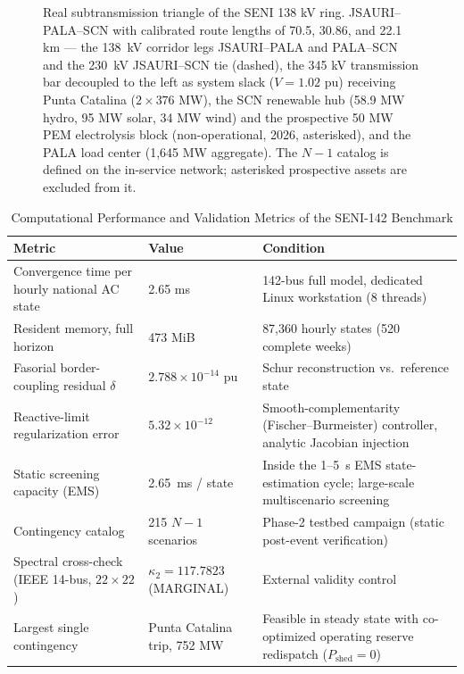 \begin{figure}[!t]
\centering
\resizebox{0.80\textwidth}{!}{} %
\caption{Real subtransmission triangle of the SENI 138 kV ring. JSAURI--PALA--SCN with calibrated route lengths of 70.5, 30.86, and 22.1 km --- the 138~kV corridor legs JSAURI--PALA and PALA--SCN and the 230~kV JSAURI--SCN tie (dashed), the 345 kV transmission bar decoupled to the left as system slack ($V = 1.02$ pu) receiving Punta Catalina ($2 \times 376$ MW), the SCN renewable hub (58.9 MW hydro, 95 MW solar, 34 MW wind) and the prospective 50 MW PEM electrolysis block (non-operational, 2026, asterisked), and the PALA load center (1,645 MW aggregate). The $N-1$ catalog is defined on the in-service network; asterisked prospective assets are excluded from it.}
\label{fig:topologia_seni}
\end{figure}

\begin{table}[!t]
\caption{Computational Performance and Validation Metrics of the SENI-142 Benchmark}
\label{tab:telemetry}
\centering
\footnotesize
\begin{tabular}{@{}p{} p{} p{}@{}}
\toprule
\textbf{Metric} & \textbf{Value} & \textbf{Condition} \\
\midrule
Convergence time per hourly national AC state & 2.65 ms & 142-bus full model, dedicated Linux workstation (8 threads) \\
Resident memory, full horizon & 473 MiB & 87,360 hourly states (520 complete weeks) \\
Fasorial border-coupling residual $\delta$ & $2.788 \times 10^{-14}$ pu & Schur reconstruction vs.\ reference state \\
Reactive-limit regularization error & $5.32 \times 10^{-12}$ & Smooth-complementarity (Fischer--Burmeister) controller, analytic Jacobian injection \\
Static screening capacity (EMS) & 2.65~ms / state & Inside the 1--5~s EMS state-estimation cycle; large-scale multiscenario screening \\
Contingency catalog & 215 $N-1$ scenarios & Phase-2 testbed campaign (static post-event verification) \\
Spectral cross-check (IEEE 14-bus, $22\times22$) & $\kappa_2 = 117.7823$ (MARGINAL) & External validity control \\
Largest single contingency & Punta Catalina trip, 752 MW & Feasible in steady state with co-optimized operating reserve redispatch ($P_{\mathrm{shed}} = 0$) \\
\bottomrule
\end{tabular}
\end{table}

